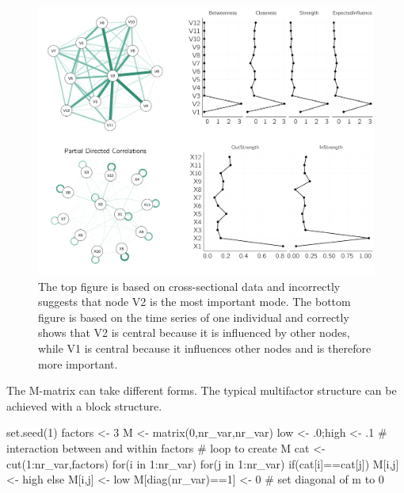 \documentclass[
  a4paper,
  DIV=11,
  numbers=noendperiod]{scrreprt}
\newenvironment{Shaded}{\begin{snugshade}}{\end{snugshade}}
\newcommand{\CommentTok}[1]{\textcolor[rgb]{0.37,0.37,0.37}{#1}}
\newcommand{\ControlFlowTok}[1]{\textcolor[rgb]{0.00,0.23,0.31}{#1}}
\newcommand{\DecValTok}[1]{\textcolor[rgb]{0.68,0.00,0.00}{#1}}
\newcommand{\FunctionTok}[1]{\textcolor[rgb]{0.28,0.35,0.67}{#1}}
\newcommand{\NormalTok}[1]{\textcolor[rgb]{0.00,0.23,0.31}{#1}}
\newcommand{\OtherTok}[1]{\textcolor[rgb]{0.00,0.23,0.31}{#1}}
\newcommand{\SpecialCharTok}[1]{\textcolor[rgb]{0.37,0.37,0.37}{#1}}
\begin{document}
\begin{figure}

{\centering \includegraphics{media/ch6/fig-ch6-img16-old-85.png}

}

\caption{\label{fig-ch6-img16-old-85}The top figure is based on
cross-sectional data and incorrectly suggests that node V2 is the most
important mode. The bottom figure is based on the time series of one
individual and correctly shows that V2 is central because it is
influenced by other nodes, while V1 is central because it influences
other nodes and is therefore more important.}

\end{figure}

The M-matrix can take different forms. The typical multifactor structure
can be achieved with a block structure.

\begin{Shaded}
\begin{Highlighting}[]
\FunctionTok{set.seed}\NormalTok{(}\DecValTok{1}\NormalTok{)}
\NormalTok{factors }\OtherTok{\textless{}{-}} \DecValTok{3}
\NormalTok{M }\OtherTok{\textless{}{-}} \FunctionTok{matrix}\NormalTok{(}\DecValTok{0}\NormalTok{,nr\_var,nr\_var)}
\NormalTok{low }\OtherTok{\textless{}{-}}\NormalTok{ .}\DecValTok{0}\NormalTok{;high }\OtherTok{\textless{}{-}}\NormalTok{ .}\DecValTok{1} \CommentTok{\# interaction between and within factors}
\CommentTok{\# loop to create M}
\NormalTok{cat }\OtherTok{\textless{}{-}} \FunctionTok{cut}\NormalTok{(}\DecValTok{1}\SpecialCharTok{:}\NormalTok{nr\_var,factors)}
\ControlFlowTok{for}\NormalTok{(i }\ControlFlowTok{in} \DecValTok{1}\SpecialCharTok{:}\NormalTok{nr\_var)}
  \ControlFlowTok{for}\NormalTok{(j }\ControlFlowTok{in} \DecValTok{1}\SpecialCharTok{:}\NormalTok{nr\_var)}
    \ControlFlowTok{if}\NormalTok{(cat[i]}\SpecialCharTok{==}\NormalTok{cat[j]) M[i,j] }\OtherTok{\textless{}{-}}\NormalTok{ high }\ControlFlowTok{else}\NormalTok{ M[i,j] }\OtherTok{\textless{}{-}}\NormalTok{ low}
\NormalTok{M[}\FunctionTok{diag}\NormalTok{(nr\_var)}\SpecialCharTok{==}\DecValTok{1}\NormalTok{] }\OtherTok{\textless{}{-}} \DecValTok{0} \CommentTok{\# set diagonal of m to 0}
\end{Highlighting}
\end{Shaded}
\end{document}
